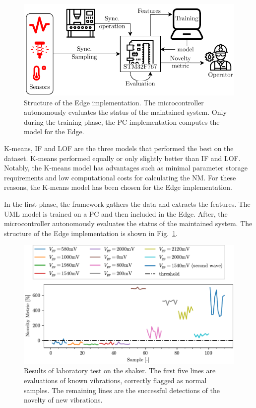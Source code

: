 \begin{figure}
    \includegraphics[width=\linewidth]{images/EmbeddedStructure.pdf}
    \caption{Structure of the Edge implementation. The microcontroller autonomously evaluates the status of the maintained system. Only during the training phase, the PC implementation computes the model for the Edge.}
    \label{fig:embedded}
\end{figure}

K-means, IF and LOF are the three models that performed the best on the dataset. K-means performed equally or only slightly better than IF and LOF. Notably, the K-means model has advantages such as minimal parameter storage requirements and low computational costs for calculating the NM. For these reasons, the K-means model has been chosen for the Edge implementation.

In the first phase, the framework gathers the data and extracts the features. The UML model is trained on a PC and then included in the Edge. After, the microcontroller autonomously evaluates the status of the maintained system. The structure of the Edge implementation is shown in Fig.~\ref{fig:embedded}. 

\begin{figure}
    \includegraphics[width=\linewidth]{images/Test02_LOF.pdf}
    \caption{Results of laboratory test on the shaker. The first five lines are evaluations of known vibrations, correctly flagged as normal samples. The remaining lines are the successful detections of the novelty of new vibrations.}
    \label{fig:shaker}
\end{figure}

